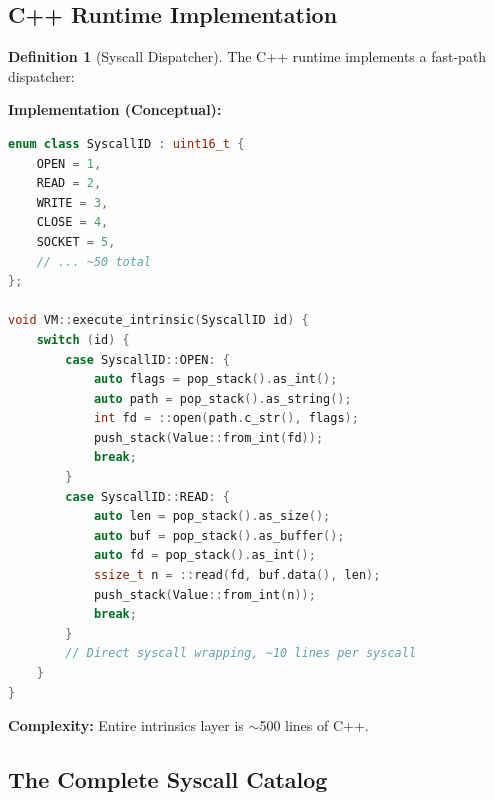 \documentclass[12pt,a4paper]{article}
\theoremstyle{definition}
\newtheorem{definition}{Definition}[section]
\begin{document}
\subsection{C++ Runtime Implementation}

\begin{definition}[Syscall Dispatcher]
The C++ runtime implements a fast-path dispatcher:

\textbf{Implementation (Conceptual):}
\begin{lstlisting}[language=CPP]
enum class SyscallID : uint16_t {
    OPEN = 1,
    READ = 2,
    WRITE = 3,
    CLOSE = 4,
    SOCKET = 5,
    // ... ~50 total
};

void VM::execute_intrinsic(SyscallID id) {
    switch (id) {
        case SyscallID::OPEN: {
            auto flags = pop_stack().as_int();
            auto path = pop_stack().as_string();
            int fd = ::open(path.c_str(), flags);
            push_stack(Value::from_int(fd));
            break;
        }
        case SyscallID::READ: {
            auto len = pop_stack().as_size();
            auto buf = pop_stack().as_buffer();
            auto fd = pop_stack().as_int();
            ssize_t n = ::read(fd, buf.data(), len);
            push_stack(Value::from_int(n));
            break;
        }
        // Direct syscall wrapping, ~10 lines per syscall
    }
}
\end{lstlisting}

\textbf{Complexity:} Entire intrinsics layer is $\sim$500 lines of C++.
\end{definition}

\subsection{The Complete Syscall Catalog}
\end{document}
